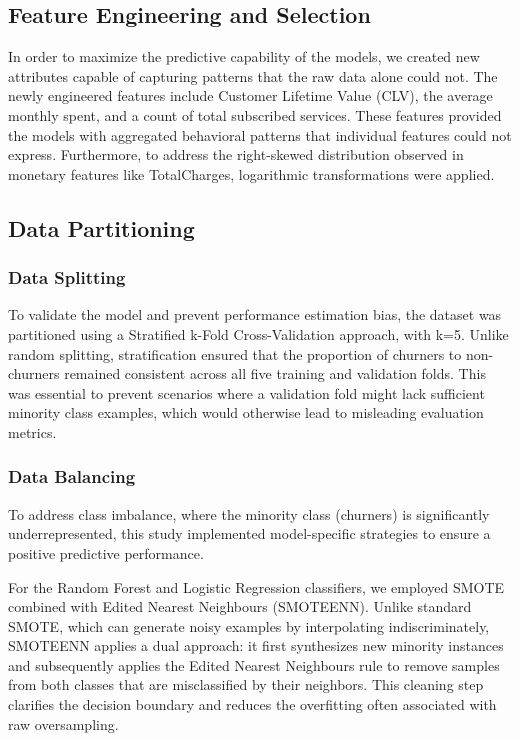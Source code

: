\documentclass[a4paper,twoside]{article}
\begin{document}
\subsection{Feature Engineering and Selection}

In order to maximize the predictive capability of the models, we created new attributes capable of capturing patterns that the raw data alone could not. The newly engineered features include Customer Lifetime Value (CLV), the average monthly spent, and a count of total subscribed services. These features provided the models with aggregated behavioral patterns that individual features could not express. Furthermore, to address the right-skewed distribution observed in monetary features like TotalCharges, logarithmic transformations were applied.

\subsection{Data Partitioning}

\subsubsection{Data Splitting}

To validate the model and prevent performance estimation bias, the dataset was partitioned using a Stratified k-Fold Cross-Validation approach, with k=5. Unlike random splitting, stratification ensured that the proportion of churners to non-churners remained consistent across all five training and validation folds. This was essential to prevent scenarios where a validation fold might lack sufficient minority class examples, which would otherwise lead to misleading evaluation metrics.

\subsubsection{Data Balancing}

To address class imbalance, where the minority class (churners) is significantly underrepresented, this study implemented model-specific strategies to ensure a positive predictive performance.

For the Random Forest and Logistic Regression classifiers, we employed SMOTE combined with Edited Nearest Neighbours (SMOTEENN). Unlike standard SMOTE, which can generate noisy examples by interpolating indiscriminately, SMOTEENN applies a dual approach: it first synthesizes new minority instances and subsequently applies the Edited Nearest Neighbours rule to remove samples from both classes that are misclassified by their neighbors. This cleaning step clarifies the decision boundary and reduces the overfitting often associated with raw oversampling.
\end{document}

